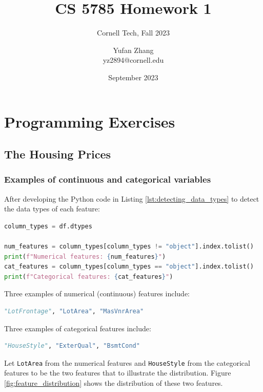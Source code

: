 \documentclass[10pt]{article}
\title{CS 5785 Homework 1}
\subtitle{Cornell Tech, Fall 2023}
\author{
    Yufan Zhang\\
    yz2894@cornell.edu
}
\date{September 2023}
\begin{document}
\maketitle

\section{Programming Exercises}

\subsection{The Housing Prices}

\subsubsection{Examples of continuous and categorical variables}

After developing the Python code in Listing \ref{lst:detecting_data_types} to detect the data types of each feature:

\begin{lstlisting}[language=Python, label={lst:detecting_data_types}, caption={Detecting the data types of each feature}]
column_types = df.dtypes

num_features = column_types[column_types != "object"].index.tolist()
print(f"Numerical features: {num_features}")
cat_features = column_types[column_types == "object"].index.tolist()
print(f"Categorical features: {cat_features}")
\end{lstlisting}

Three examples of numerical (continuous) features include:

\begin{lstlisting}[language=Python]
    "LotFrontage", "LotArea", "MasVnrArea"
\end{lstlisting}

Three examples of categorical features include:

\begin{lstlisting}[language=Python]
    "HouseStyle", "ExterQual", "BsmtCond"
\end{lstlisting}

Let \texttt{LotArea} from the numerical features and \texttt{HouseStyle} from the categorical features to be the two features that to illustrate the distribution. Figure \ref{fig:feature_distribution} shows the distribution of these two features.
\end{document}
